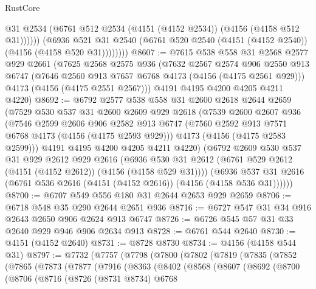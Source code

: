 \begin{lexlean}{RustCore}
\begin{coremodule}
                  @31
                  @2534
                  (@6761 @512 @2534 (@4151 (@4152 @2534)) (@4156 (@4158 @512 @31))))))
            (@6936
              @521
              @31
              @2540
              (@6761 @520 @2540 (@4151 (@4152 @2540)) (@4156 (@4158 @520 @31))))))))
@8607 := @7615
    @538
    @558
    @31
    @2568
    @2577
    @929
    @2661
    (@7625
      @2568
      @2575
      @936
      (@7632
        @2567
        @2574
        @906
        @2550
        @913
        @6747
        (@7646 @2560 @913 @7657 @6768 @4173 (@4156 (@4175 @2561 @929)))
        @4173
        (@4156 (@4175 @2551 @2567)))
      @4191
      @4195
      @4200
      @4205
      @4211
      @4220)
@8692 := @6792
    @2577
    @538
    @558
    @31
    @2600
    @2618
    @2644
    @2659
    (@7529
      @530
      @537
      @31
      @2600
      @2609
      @929
      @2618
      (@7539
        @2600
        @2607
        @936
        (@7546
          @2599
          @2606
          @906
          @2582
          @913
          @6747
          (@7560 @2592 @913 @7571 @6768 @4173 (@4156 (@4175 @2593 @929)))
          @4173
          (@4156 (@4175 @2583 @2599)))
        @4191
        @4195
        @4200
        @4205
        @4211
        @4220)
      (@6792
        @2609
        @530
        @537
        @31
        @929
        @2612
        @929
        @2616
        (@6936 @530 @31 @2612 (@6761 @529 @2612 (@4151 (@4152 @2612)) (@4156 (@4158 @529 @31))))
        (@6936 @537 @31 @2616 (@6761 @536 @2616 (@4151 (@4152 @2616)) (@4156 (@4158 @536 @31))))))
@8700 := @6707 @549 @556 @180 @31 @2644 @2653 @929 @2659
@8706 := @6718 @548 @35 @290 @2644 @2651 @936
@8716 := @6727 @547 @31 @34 @916 @2643 @2650 @906 @2624 @913 @6747
@8726 := @6726 @545 @57 @31 @33 @2640 @929 @946 @906 @2634 @913
@8728 := @6761 @544 @2640
@8730 := @4151 (@4152 @2640)
@8731 := @8728 @8730
@8734 := @4156 (@4158 @544 @31)
@8797 := @7732
    (@7757
      (@7798
        (@7800
          (@7802
            (@7819
              (@7835
                (@7852
                  (@7865
                    (@7873
                      (@7877
                        (@7916
                          (@8363
                            (@8402
                              (@8568
                                (@8607
                                  (@8692
                                    (@8700
                                      (@8706
                                        (@8716
                                          (@8726
                                            (@8731 @8734)
                                            @6768

\end{coremodule}
\end{lexlean}
